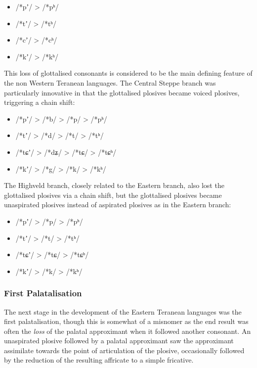 \documentclass[grammar]{subfiles}
\begin{document}
\begin{itemize}
  \item /*pʼ/ > /*pʰ/  
  \item /*tʼ/ > /*tʰ/  
  \item /*cʼ/ > /*cʰ/  
  \item /*kʼ/ > /*kʰ/  
\end{itemize}

This loss of glottalised consonants is considered to be the main defining
feature of the non Western Teranean languages.  The Central Steppe branch was
particularly innovative in that the glottalised plosives became voiced
plosives, triggering a chain shift:

\begin{itemize}
  \item /*pʼ/ > /*b/ > /*p/ > /*pʰ/  
  \item /*tʼ/ > /*d/ > /*t/ > /*tʰ/  
  \item /*tɕʼ/ > /*dʑ/ > /*tɕ/ > /*tɕʰ/  
  \item /*kʼ/ > /*g/ > /*k/ > /*kʰ/  
\end{itemize}

The Highveld branch, closely related to the Eastern branch, also lost the
glottalised plosives via a chain shift, but the glottalised plosives became unaspirated
plosives instead of aspirated plosives as in the Eastern branch:

\begin{itemize}
  \item /*pʼ/ > /*p/ > /*pʰ/  
  \item /*tʼ/ > /*t/ > /*tʰ/  
  \item /*tɕʼ/ > /*tɕ/ > /*tɕʰ/  
  \item /*kʼ/ > /*k/ > /*kʰ/  
\end{itemize}

\subsubsection{First Palatalisation}
\label{sssec:history:east:first_palatalisation}

The next stage in the development of the Eastern Teranean languages was the
first palatalisation, though this is somewhat of a misnomer as the end result
was often the \emph{loss} of the palatal approximant when it followed another
consonant.  An unaspirated plosive followed by a palatal approximant saw the
approximant assimilate towards the point of articulation of the plosive,
occasionally followed by the reduction of the resulting affricate to a simple
fricative.
\end{document}
